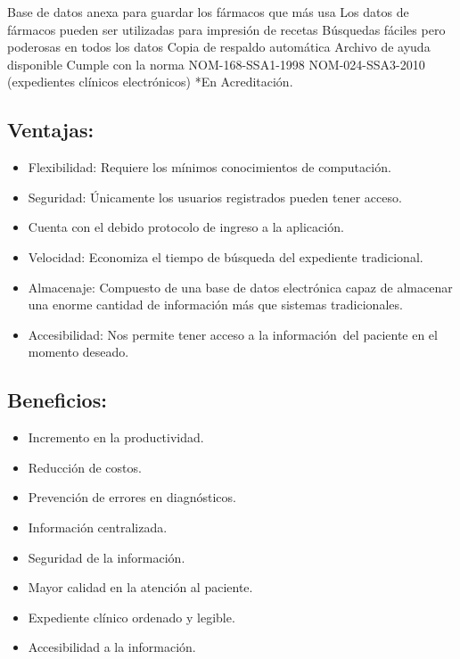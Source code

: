 Base de datos anexa para guardar los fármacos que más usa
Los datos de fármacos pueden ser utilizadas para impresión de recetas
Búsquedas fáciles pero poderosas en todos los datos
Copia de respaldo automática
Archivo de ayuda disponible
Cumple con la norma NOM-168-SSA1-1998
NOM-024-SSA3-2010 (expedientes clínicos electrónicos) *En Acreditación. \cite{elex}

\subsection{Ventajas:}
\begin{itemize}
  \item Flexibilidad: Requiere los mínimos conocimientos de computación.
  \item Seguridad: Únicamente los usuarios registrados pueden tener acceso. 
  \item Cuenta con el debido protocolo de ingreso a la aplicación.
  \item Velocidad: Economiza el tiempo de búsqueda del expediente tradicional.
  \item Almacenaje: Compuesto de una base de datos electrónica capaz de almacenar una enorme cantidad de información más que sistemas tradicionales.
  \item Accesibilidad: Nos permite tener acceso a la información del paciente en el momento deseado.
\cite{elex}
\end{itemize}

\subsection{Beneficios:}
\begin{itemize}
  \item Incremento en la productividad.
  \item Reducción de costos.
  \item Prevención de errores en diagnósticos.
  \item Información centralizada.
  \item Seguridad de la información.
  \item Mayor calidad en la atención al paciente.
  \item Expediente clínico ordenado y legible.
  \item Accesibilidad a la información.
\cite{elex}
\end{itemize}


